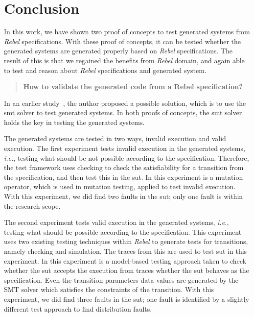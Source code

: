 \chapter{Conclusion}\label{sec:ch7}

In this work, we have shown two proof of concepts to test generated systems from
\textit{Rebel} specifications. With these proof of concepts, it can be tested
whether the generated systems are generated properly based on \textit{Rebel}
specifications. The result of this is that we regained the benefits from
\textit{Rebel} domain, and again able to test and reason about \textit{Rebel}
specifications and generated system.

\begin{quote}
  \textbf{How to validate the generated code from a Rebel specification?}
\end{quote}

In an earlier study~\cite[p.3]{stoel2015case}, the author proposed a possible
solution, which is to use the \gls{smt} solver to test generated systems.
In both proofs of concepts, the \gls{smt} solver holds the key in testing the
generated systems.

The generated systems are tested in two ways, invalid execution and valid execution.
The first experiment tests invalid execution in the generated systems, \textit{i.e.},
testing what should be not possible according to the specification.
Therefore, the test framework uses checking to check the satisfiability for a
transition from the specification, and then test this in the \gls{sut}.
In this experiment is a mutation operator, which is used in mutation testing,
applied to test invalid execution. With this experiment, we did find two faults in
the \gls{sut}; only one fault is within the research scope.

The second experiment tests valid execution in the generated systems,
\textit{i.e.}, testing what should be possible according to the specification.
This experiment uses two existing testing techniques within \textit{Rebel} to
generate tests for transitions, namely checking and simulation.
The traces from this are used to test \gls{sut} in this experiment.
In this experiment is a model-based testing approach taken to check whether the
\gls{sut} accepts the execution from traces whether the \gls{sut} behaves as the
specification.
Even the transition parameters data values are generated by the SMT solver which
satisfies the constraints of the transition. With this experiment, we did find
three faults in the \gls{sut}; one fault is identified by a slightly different test
approach to find distribution faults.

